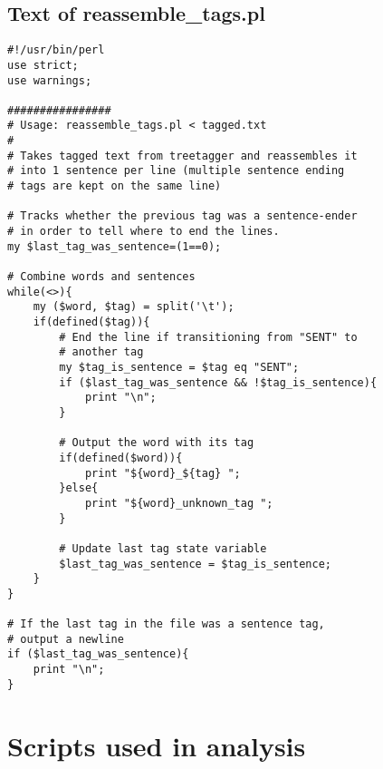 \documentclass[eric_thesis.tex]{subfiles}
\begin{document}
\section{Text of reassemble\_tags.pl}
\label{app:reassembletags}
\lstset{language=Perl}
\begin{lstlisting}
#!/usr/bin/perl
use strict;
use warnings;

################
# Usage: reassemble_tags.pl < tagged.txt
#
# Takes tagged text from treetagger and reassembles it
# into 1 sentence per line (multiple sentence ending
# tags are kept on the same line)

# Tracks whether the previous tag was a sentence-ender
# in order to tell where to end the lines.
my $last_tag_was_sentence=(1==0);

# Combine words and sentences
while(<>){
    my ($word, $tag) = split('\t');
    if(defined($tag)){
        # End the line if transitioning from "SENT" to
        # another tag
        my $tag_is_sentence = $tag eq "SENT";
        if ($last_tag_was_sentence && !$tag_is_sentence){
            print "\n";
        }

        # Output the word with its tag
        if(defined($word)){
            print "${word}_${tag} ";
        }else{
            print "${word}_unknown_tag ";
        }

        # Update last tag state variable
        $last_tag_was_sentence = $tag_is_sentence;
    }
}

# If the last tag in the file was a sentence tag,
# output a newline
if ($last_tag_was_sentence){
    print "\n";
}
\end{lstlisting}

\chapter{Scripts used in analysis}
\end{document}
